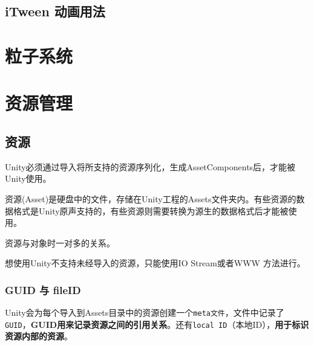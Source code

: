 \documentclass[UTF8,a4paper,12pt]{ctexbook}
\begin{document}
	\section{iTween 动画用法}
		

\chapter{粒子系统}

		

				
				
\chapter{资源管理}
	\section{资源}
		Unity必须通过导入将所支持的资源序列化，生成AssetComponents后，才能被Unity使用。
		
		资源(Asset)是硬盘中的文件，存储在Unity工程的Assets文件夹内。有些资源的数据格式是Unity原声支持的，有些资源则需要转换为源生的数据格式后才能被使用。
	
		资源与对象时一对多的关系。
		
		想使用Unity不支持未经导入的资源，只能使用IO Stream或者WWW 方法进行。
	
		\subsection{GUID 与 fileID}
			Unity会为每个导入到Assets目录中的资源创建一个\verb|meta文件|，文件中记录了\verb|GUID|，\textbf{GUID用来记录资源之间的引用关系}。还有\verb|local ID|（本地ID），\textbf{用于标识资源内部的资源}。
			
\end{document}

